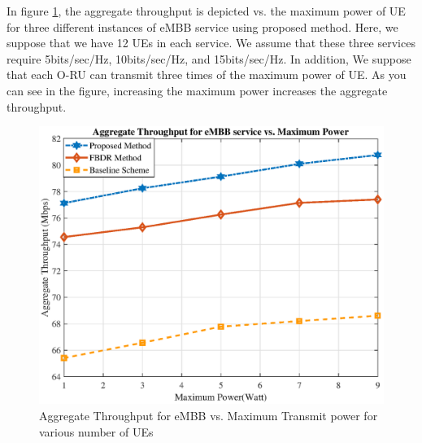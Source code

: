 \documentclass[conference]{IEEEtran}
\begin{document}
In figure \ref{fig:5}, the aggregate throughput is depicted vs. the maximum power of UE for three different instances of eMBB service using proposed method. Here, we suppose that we have 12 UEs in each service.  We assume that these three services require 5bits/sec/Hz, 10bits/sec/Hz, and 15bits/sec/Hz.
In addition, We suppose that each O-RU can transmit three times of the maximum power of UE. As you can see in the figure, increasing the maximum power increases the aggregate throughput.   

\begin{figure}
  \centering 
    \includegraphics[scale = 0.5]{RatePower1.eps}
  \caption{Aggregate Throughput for eMBB vs. Maximum Transmit power for various number of UEs }
  \label{fig:5}
\end{figure}
\end{document}
